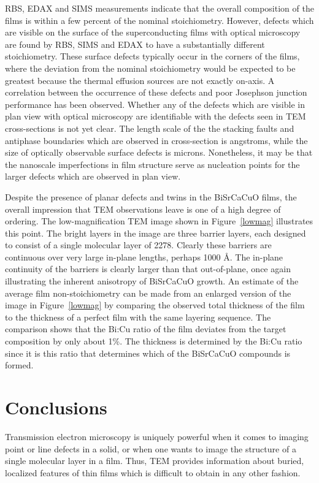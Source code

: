 RBS, EDAX and SIMS measurements indicate that the overall composition
of the films is within a few percent of the nominal
stoichiometry. However, defects which are visible on the surface of
the superconducting films with optical microscopy are found by RBS,
SIMS and EDAX to have a substantially different
stoichiometry.\cite{howell} These surface defects typically occur in
the corners of the films, where the deviation from the nominal
stoichiometry would be expected to be greatest because the thermal
effusion sources are not exactly on-axis.  A correlation between the
occurrence of these defects and poor Josephson junction performance
has been observed.\cite{howell} Whether any of the defects which are
visible in plan view with optical microscopy are identifiable with the
defects seen in TEM cross-sections is not yet clear.  The length scale
of the the stacking faults and antiphase boundaries which are observed
in cross-section is angstroms, while the size of optically observable
surface defects is microns.  Nonetheless, it may be that the nanoscale
imperfections in film structure serve as nucleation points for the
larger defects which are observed in plan view.

Despite the presence of planar defects and twins in the BiSrCaCuO
films, the overall impression that TEM observations leave is one of a
high degree of ordering.  The low-magnification TEM image shown in
Figure~\ref{lowmag} illustrates this point.  The bright layers in the
image are three barrier layers, each designed to consist of a single
molecular layer of 2278.  Clearly these barriers are continuous over
very large in-plane lengths, perhaps 1000 \AA.  The in-plane continuity
of the barriers is clearly larger than that out-of-plane, once again
illustrating the inherent anisotropy of BiSrCaCuO growth.  An estimate
of the average film non-stoichiometry can be made from an enlarged
version of the image in Figure~\ref{lowmag} by comparing the observed
total thickness of the film to the thickness of a perfect film with
the same layering sequence.  The comparison shows that the Bi:Cu ratio
of the film deviates from the target composition by only about 1\%.
The thickness is determined by the Bi:Cu ratio since it is this ratio
that determines which of the BiSrCaCuO compounds is formed.


\section{Conclusions}

Transmission electron microscopy is uniquely powerful when it comes to
imaging point or line defects in a solid, or when one wants to image
the structure of a single molecular layer in a film.  Thus, TEM
provides information about buried, localized features of thin films
which is difficult to obtain in any other fashion.


